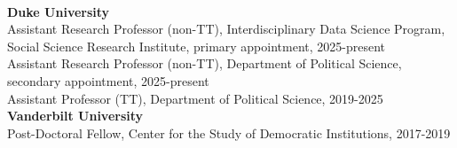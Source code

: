 \documentclass[11pt]{article}
\begin{document}
\vspace{.3in}
\begin{minipage}[t]{.21\textwidth}
	\flushright
	 \hspace*{.2in}  \\
\end{minipage}
\begin{minipage}[t]{.79\textwidth}
	\textbf{Duke University}   \\
	\hspace*{.15in}Assistant Research Professor (non-TT), Interdisciplinary Data Science Program,\\
	\hspace*{.15in}Social Science Research Institute, primary appointment, 2025-present \\

\vspace{-.1in}
	\hspace*{.15in}Assistant Research Professor (non-TT), Department of Political Science, \\
	\hspace*{.15in}secondary appointment, 2025-present \\

\vspace{-.1in}
	\hspace*{.15in}Assistant Professor (TT), Department of Political Science, 2019-2025\\

	\textbf{Vanderbilt University}   \\
	\hspace*{.15in}Post-Doctoral Fellow, Center for the Study of Democratic Institutions, 2017-2019  \\
\end{minipage}


\end{document}
